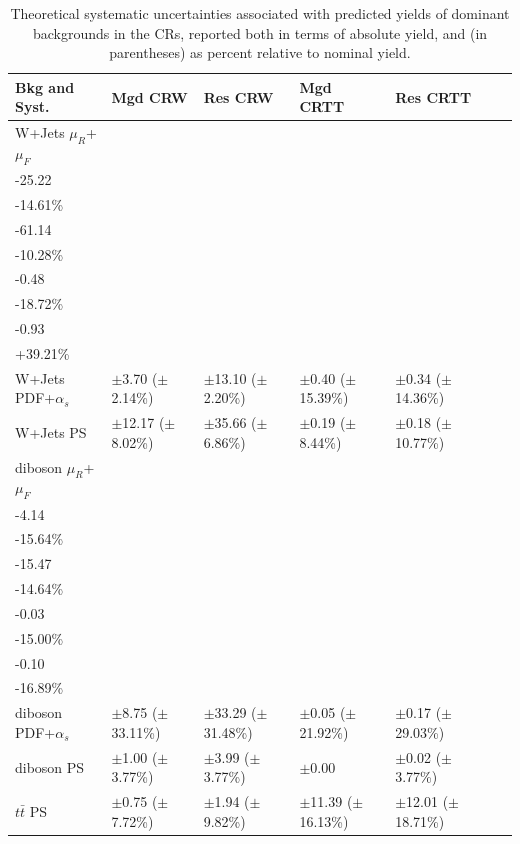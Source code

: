 \begin{table}[ht]
\footnotesize{
\caption{\label{tab:systs_bkg_CR} Theoretical systematic uncertainties associated with predicted yields of dominant backgrounds in the CRs, reported both in terms of absolute yield, and (in parentheses) as percent relative to nominal yield.}
\begin{tabular}{l l l l l l l }
\toprule
\textbf{Bkg and Syst.} & \textbf{Mgd CRW} & \textbf{Res CRW} & \textbf{Mgd CRTT} & \textbf{Res CRTT}\tabularnewline
\midrule
\midrule
W+Jets \(\mu_R\)+\(\mu_F\) & \(\substack{+42.91\\-25.22}\) \big(\(\substack{+24.86\%\\-14.61\%}\)\big) & \(\substack{+36.17\\-61.14}\) \big(\(\substack{+6.08\%\\-10.28\%}\)\big) & \(\substack{+3.55\\-0.48}\) \big(\(\substack{+137.61\%\\-18.72\%}\)\big) & \(\substack{+6.27\\-0.93}\) \big(\(\substack{-262.80\%\\+39.21\%}\)\big) \tabularnewline
\midrule
W+Jets PDF+\(\alpha_s\) & \(\pm\)3.70 (\(\pm\)2.14\%) &\(\pm\)13.10 (\(\pm\)2.20\%) &\(\pm\)0.40 (\(\pm\)15.39\%) &\(\pm\)0.34 (\(\pm\)14.36\%) \tabularnewline
\midrule
W+Jets PS & \(\pm\)12.17 (\(\pm\)8.02\%) &\(\pm\)35.66 (\(\pm\)6.86\%) &\(\pm\)0.19 (\(\pm\)8.44\%) &\(\pm\)0.18 (\(\pm\)10.77\%) \tabularnewline
\midrule
diboson \(\mu_R\)+\(\mu_F\) & \(\substack{+1.02\\-4.14}\) \big(\(\substack{+3.84\%\\-15.64\%}\)\big) & \(\substack{+18.40\\-15.47}\) \big(\(\substack{+17.40\%\\-14.64\%}\)\big) & \(\substack{+0.04\\-0.03}\) \big(\(\substack{+19.96\%\\-15.00\%}\)\big) & \(\substack{+0.13\\-0.10}\) \big(\(\substack{+22.85\%\\-16.89\%}\)\big) \tabularnewline
\midrule
diboson PDF+\(\alpha_s\) & \(\pm\)8.75 (\(\pm\)33.11\%) &\(\pm\)33.29 (\(\pm\)31.48\%) &\(\pm\)0.05 (\(\pm\)21.92\%) &\(\pm\)0.17 (\(\pm\)29.03\%) \tabularnewline
\midrule
diboson PS & \(\pm\)1.00 (\(\pm\)3.77\%) &\(\pm\)3.99 (\(\pm\)3.77\%) &\(\pm\)0.00 &\(\pm\)0.02 (\(\pm\)3.77\%) \tabularnewline
\midrule
\(t\bar{t}\) PS & \(\pm\)0.75 (\(\pm\)7.72\%) &\(\pm\)1.94 (\(\pm\)9.82\%) &\(\pm\)11.39 (\(\pm\)16.13\%) &\(\pm\)12.01 (\(\pm\)18.71\%) \tabularnewline

\end{tabular}}
\end{table}
